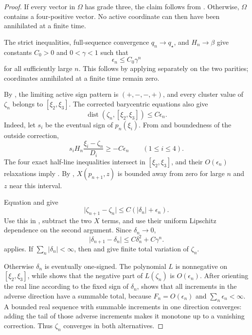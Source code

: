 \documentclass[11pt]{article}
\begin{document}
\begin{proof}
If every vector in \(\Omega\) has grade three, the claim follows from
.  Otherwise, \(\Omega\) contains a
four-positive vector.  No active coordinate can then have been annihilated
at a finite time.

The strict inequalities, full-sequence convergence \(q_n\to q_\star\),
and \(H_n\to\beta\) give constants \(C_0>0\) and \(0<\gamma<1\) such
that
\[
 \epsilon_n\leq C_0\gamma^n
\tag{66}\label{eq:strict-gap-geometric}
\]
for all sufficiently large \(n\).  This follows by applying
 separately on the two parities; coordinates
annihilated at a finite time remain zero.

By , the limiting active sign pattern is
\((+,-,-,+)\), and every cluster value of \(\zeta_n\) belongs to
\([\xi_2,\xi_3]\).  The corrected barycentric equations also give
\[
 \operatorname{dist}(\zeta_n,[\xi_2,\xi_3])
 \leq C\epsilon_n.
\tag{67}\label{eq:zeta-gap-distance}
\]
Indeed, let \(s_i\) be the eventual sign of \(p_n(\xi_i)\).  From
 and boundedness of the outside correction,
\[
 s_iH_n\frac{\xi_i-\zeta_n}{D_i}\geq-C\epsilon_n
 \qquad(1\leq i\leq4).
\]
The four exact half-line inequalities intersect in
\([\xi_2,\xi_3]\), and their \(O(\epsilon_n)\) relaxations imply
.  By ,
\(X(p_{n+1},z)\) is bounded away from zero for large \(n\) and
\(z\) near this interval.

Equation  and
 give
\[
 \lvert\zeta_{n+1}-\zeta_n\rvert
 \leq C(\lvert\delta_n\rvert+\epsilon_n).
\]
Use this in , subtract the two \(X\)
terms, and use their uniform Lipschitz dependence on the second argument.
Since \(\delta_n\to0\),
\[
 \lvert\delta_{n+1}-\delta_n\rvert
 \leq C\delta_n^2+C\gamma^n.
\tag{68}\label{eq:strict-defect-parabolic}
\]
 applies.  If
\(\sum_n\lvert\delta_n\rvert<\infty\), then
 and  give
finite total variation of \(\zeta_n\).

Otherwise \(\delta_n\) is eventually one-signed.  The polynomial \(L\) is
nonnegative on \([\xi_2,\xi_3]\), while
 shows that the negative part of
\(L(\zeta_n)\) is \(O(\epsilon_n)\).  After orienting the real line
according to the fixed sign of \(\delta_n\),
 shows that all increments in the adverse
direction have a summable total, because \(F_n=O(\epsilon_n)\) and
\(\sum_n\epsilon_n<\infty\).  A bounded real sequence with summable
increments in one direction converges: adding the tail of those adverse
increments makes it monotone up to a vanishing correction.  Thus
\(\zeta_n\) converges in both alternatives.


\end{proof}
\end{document}
